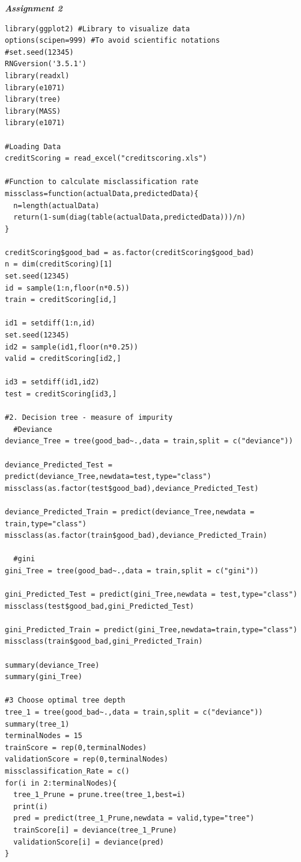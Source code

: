 \documentclass[a4paper,10pt]{article}
\begin{document}
\par
\vspace{0.5cm}
\large \textit{\textbf{Assignment 2}} \par
\begin{lstlisting}
library(ggplot2) #Library to visualize data
options(scipen=999) #To avoid scientific notations
#set.seed(12345)
RNGversion('3.5.1')
library(readxl)
library(e1071)
library(tree)
library(MASS)
library(e1071)

#Loading Data
creditScoring = read_excel("creditscoring.xls")

#Function to calculate misclassification rate
missclass=function(actualData,predictedData){
  n=length(actualData)
  return(1-sum(diag(table(actualData,predictedData)))/n)
}

creditScoring$good_bad = as.factor(creditScoring$good_bad)
n = dim(creditScoring)[1]
set.seed(12345)
id = sample(1:n,floor(n*0.5))
train = creditScoring[id,]

id1 = setdiff(1:n,id)
set.seed(12345)
id2 = sample(id1,floor(n*0.25))
valid = creditScoring[id2,]

id3 = setdiff(id1,id2)
test = creditScoring[id3,]

#2. Decision tree - measure of impurity
  #Deviance
deviance_Tree = tree(good_bad~.,data = train,split = c("deviance"))

deviance_Predicted_Test = predict(deviance_Tree,newdata=test,type="class")
missclass(as.factor(test$good_bad),deviance_Predicted_Test)

deviance_Predicted_Train = predict(deviance_Tree,newdata = train,type="class")
missclass(as.factor(train$good_bad),deviance_Predicted_Train)

  #gini
gini_Tree = tree(good_bad~.,data = train,split = c("gini"))

gini_Predicted_Test = predict(gini_Tree,newdata = test,type="class")
missclass(test$good_bad,gini_Predicted_Test)

gini_Predicted_Train = predict(gini_Tree,newdata=train,type="class")
missclass(train$good_bad,gini_Predicted_Train)

summary(deviance_Tree)
summary(gini_Tree)

#3 Choose optimal tree depth
tree_1 = tree(good_bad~.,data = train,split = c("deviance"))
summary(tree_1)
terminalNodes = 15
trainScore = rep(0,terminalNodes)
validationScore = rep(0,terminalNodes)
missclassification_Rate = c()
for(i in 2:terminalNodes){
  tree_1_Prune = prune.tree(tree_1,best=i)
  print(i)
  pred = predict(tree_1_Prune,newdata = valid,type="tree")
  trainScore[i] = deviance(tree_1_Prune)
  validationScore[i] = deviance(pred)
}


\end{lstlisting}
\end{document}
